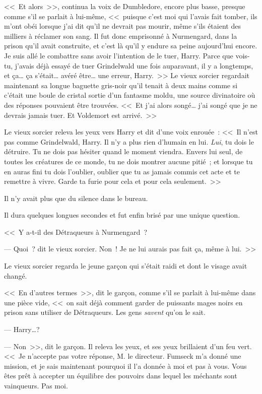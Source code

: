 <<~Et alors~>>, continua la voix de Dumbledore, encore plus basse, presque comme s'il se parlait à lui-même, <<~puisque c'est moi qui l'avais fait tomber, ils m'ont obéi lorsque j'ai dit qu'il ne devrait pas mourir, même s'ils étaient des milliers à réclamer son sang. Il fut donc emprisonné à Nurmengard, dans la prison qu'il avait construite, et c'est là qu'il y endure sa peine aujourd'hui encore. Je suis allé le combattre sans avoir l'intention de le tuer, Harry. Parce que vois-tu, j'avais déjà essayé de tuer Grindelwald une fois auparavant, il y a longtemps, et ça… ça s'était… avéré être… une erreur, Harry.~>> Le vieux sorcier regardait maintenant sa longue baguette gris-noir qu'il tenait à deux mains comme si c'était une boule de cristal sortie d'un fantasme moldu, une source divinatoire où des réponses pouvaient être trouvées. <<~Et j'ai alors songé… j'ai songé que je ne devrais jamais tuer. Et Voldemort est arrivé.~>>

Le vieux sorcier releva les yeux vers Harry et dit d'une voix enrouée~: <<~Il n'est pas comme Grindelwald, Harry. Il n'y a plus rien d'humain en lui. \emph{Lui}, tu dois le détruire. Tu ne dois pas hésiter quand le moment viendra. Envers lui seul, de toutes les créatures de ce monde, tu ne dois montrer aucune pitié~; et lorsque tu en auras fini tu dois l'oublier, oublier que tu as jamais commis cet acte et te remettre à vivre. Garde ta furie pour cela et pour cela seulement.~>>

Il n'y avait plus que du silence dans le bureau.

Il dura quelques longues secondes et fut enfin brisé par une unique question.

<<~Y a-t-il des Détraqueurs à Nurmengard~?

--- Quoi~? dit le vieux sorcier. Non~! Je ne lui aurais pas fait ça, même à lui.~>>

\later

Le vieux sorcier regarda le jeune garçon qui s'était raidi et dont le visage avait changé.

<<~En d'autres termes~>>, dit le garçon, comme s'il se parlait à lui-même dans une pièce vide, <<~on sait déjà comment garder de puissants mages noirs en prison sans utiliser de Détraqueurs. Les gens \emph{savent} qu'on le sait.

--- Harry…?

--- Non~>>, dit le garçon. Il releva les yeux, et ses yeux brillaient d'un feu vert. <<~Je n'accepte pas votre réponse, M. le directeur. Fumseck m'a donné une mission, et je sais maintenant pourquoi il l'a donnée à moi et pas à vous. Vous êtes prêt à accepter un équilibre des pouvoirs dans lequel les méchants sont vainqueurs. Pas moi.

